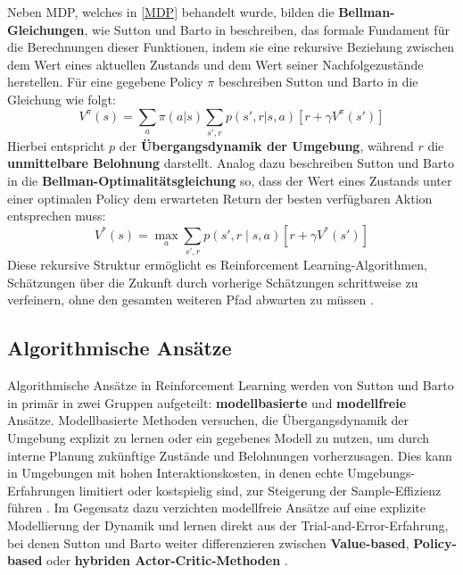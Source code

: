 Neben MDP, welches in \autoref{MDP} behandelt wurde, bilden die \textbf{Bellman-Gleichungen}, wie Sutton und Barto in \cite{sutton2018reinforcement} beschreiben, das formale Fundament für die Berechnungen dieser Funktionen, indem sie eine rekursive Beziehung zwischen dem Wert eines aktuellen Zustands und dem Wert seiner Nachfolgezustände herstellen. Für eine gegebene Policy $\pi$ beschreiben Sutton und Barto in \cite{sutton2018reinforcement} die Gleichung wie folgt:
\begin{equation}
	V^{\pi}(s) = \sum_{a}\pi(a|s)\sum_{s',r}p(s',r|s,a)[r+\gamma V^{\pi}(s')]
\end{equation}
Hierbei entspricht $p$ der \textbf{Übergangsdynamik der Umgebung}, während $r$ die \textbf{unmittelbare Belohnung} darstellt. Analog dazu beschreiben Sutton und Barto in \cite{sutton2018reinforcement} die \textbf{Bellman-Optimalitätsgleichung} so, dass der Wert eines Zustands unter einer optimalen Policy dem erwarteten Return der besten verfügbaren Aktion entsprechen muss:
\begin{equation}
	V^{*}(s) = \max_a\sum_{s',r}p(s',r\mid s,a)[r+\gamma V^{*}(s')]
\end{equation}
Diese rekursive Struktur ermöglicht es Reinforcement Learning-Algorithmen, Schätzungen über die Zukunft durch vorherige Schätzungen schrittweise zu verfeinern, ohne den gesamten weiteren Pfad abwarten zu müssen \cite{sutton2018reinforcement, arulkumaranDRL2017}.
\subsection{Algorithmische Ansätze} \label{algo_rl}
Algorithmische Ansätze in Reinforcement Learning werden von Sutton und Barto in \cite{sutton2018reinforcement} primär in zwei Gruppen aufgeteilt: \textbf{modellbasierte} und \textbf{modellfreie} Ansätze. Modellbasierte Methoden versuchen, die Übergangsdynamik der Umgebung explizit zu lernen oder ein gegebenes Modell zu nutzen, um durch interne Planung zukünftige Zustände und Belohnungen vorherzusagen. Dies kann in Umgebungen mit hohen Interaktionskosten, in denen echte Umgebungs-Erfahrungen limitiert oder kostspielig sind, zur Steigerung der Sample-Effizienz führen \cite{arulkumaranDRL2017}. \newline
Im Gegensatz dazu verzichten modellfreie Ansätze auf eine explizite Modellierung der Dynamik und lernen direkt aus der Trial-and-Error-Erfahrung, bei denen Sutton und Barto weiter differenzieren zwischen \textbf{Value-based}, \textbf{Policy-based} oder \textbf{hybriden Actor-Critic-Methoden} \cite{sutton2018reinforcement}.

